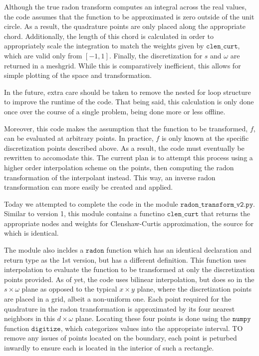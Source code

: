 \documentclass[12pt]{article}
\begin{document}
Although the true radon transform computes an integral across the real values, the code assumes that the function to be approximated is zero outside of the unit circle.
As a result, the quadrature points are only placed along the appropriate chord.
Additionally, the length of this chord is calculated in order to appropriately scale the integration to match the weights given by $\texttt{clen\_curt}$, which are valid only from $[-1, 1]$. 
Finally, the discretization for $s$ and $\omega$ are returned in a meshgrid.
While this is comparatively inefficient, this allows for simple plotting of the space and transformation.

In the future, extra care should be taken to remove the nested for loop structure to improve the runtime of the code.
That being said, this calculation is only done once over the course of a single problem, being done more or less offline.

Moreover, this code makes the assumption that the function to be transformed, $f$, can be evaluated at arbitrary points. In practice, $f$ is only known at the specific discretization points described above.
As a result, the code must eventually be rewritten to accomodate this.
The current plan is to attempt this process using a higher order interpolation scheme on the points, then computing the radon transformation of the interpolant instead.
This way, an inverse radon transformation can more easily be created and applied.

Today we attempted to complete the code in the module $\texttt{radon\_transform\_v2.py}$.
Similar to version 1, this module contains a functino $\texttt{clen\_curt}$ that returns the appropriate nodes and weights for Clenshaw-Curtis approximation, the source for which is identical.

The module also incldes a $\texttt{radon}$ function which has an identical declaration and return type as the 1st version, but has a different definition.
This function uses interpolation to evaluate the function to be transformed at only the discretization points provided.
As of yet, the code uses bilinear interpolation, but does so in the $s \times \omega$ plane as opposed to the typical $x \times y$ plane, where the discretization points are placed in a grid, albeit a non-uniform one.
Each point required for the quadrature in the radon transformation is approximated by its four nearest neighbors in this $d \times \omega$ plane.
Locating these four points is done using the $\texttt{numpy}$ function $\texttt{digitize}$, which categorizes values into the appropriate interval.
TO remove any issues of points located on the boundary, each point is peturbed inwardly to ensure each is located in the interior of such a rectangle.
\end{document}
